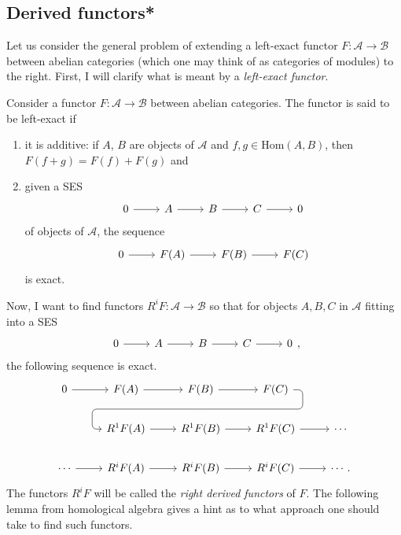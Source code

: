 \subsection{Derived functors*}
Let us consider the general problem of extending a left-exact
functor $F:\mathcal{A}\to\mathcal{B}$ between abelian categories
(which one may think of as categories of modules) to the right.
First, I will clarify what is meant by a \emph{left-exact functor}.
\begin{defin}
  Consider a functor $F:\mathcal{A}\to\mathcal{B}$ between abelian
  categories. The functor is said to be left-exact if
  \begin{enumerate}
    \item it is additive: if $A$, $B$ are objects of $\mathcal{A}$
          and $f, g\in\text{Hom}(A, B)$, then $F(f+g)=F(f)+F(g)$ and
    \item given a SES
          \[\begin{tikzcd}
              0\rar & A\rar & B\rar & C\rar & 0
            \end{tikzcd}\]
          of objects of $\mathcal{A}$, the sequence
          \[\begin{tikzcd}
              0\rar & F(A)\rar & F(B)\rar & F(C)
            \end{tikzcd}\]
          is exact.
  \end{enumerate}
\end{defin}
Now, I want to find functors $R^{i}F:\mathcal{A}\to\mathcal{B}$
so that for objects $A,B,C$ in $\mathcal{A}$ fitting into a SES
\[\begin{tikzcd}
    0\rar & A\rar & B\rar & C\rar & 0
  \end{tikzcd},\]
the following sequence is exact.
\[
\begin{tikzcd}
  0 \rar & F(A) \rar & F(B)
  \rar\dar[phantom, ""{coordinate, name=Z}] & F(C)
  \arrow[rounded corners, to path={ -- ([xshift=2ex]\tikztostart.east)
    |- (Z) -| ([xshift=-2ex]\tikztotarget.west) -- (\tikztotarget)},
  overlay]{dll} & \\
  & R^{1}F(A)\rar & R^{1}F(B)\rar
  & R^{1}F(C)\rar & \cdots \\
  \cdots\rar & R^{i}F(A)\rar & R^{i}F(B)\rar
  & R^{i}F(C)\rar & \cdots.
\end{tikzcd}
\]
The functors $R^{i}F$ will be called the \emph{right
  derived functors} of $F$. The following lemma from homological
algebra gives a hint as to what approach one should take to find such functors.

